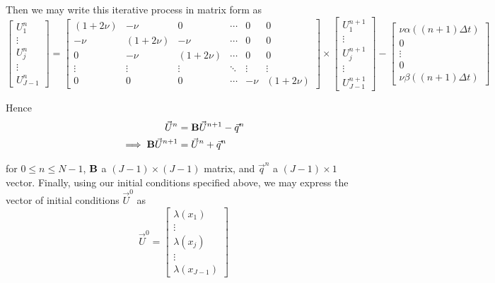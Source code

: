 \documentclass[12pt]{article}
\begin{document}
Then we may write this iterative process in matrix form as
\begin{equation*}
	\begin{bmatrix}
		U^n_1 \\
		\vdots \\
		U^n_j \\
		\vdots \\
		U^n_{J - 1}
	\end{bmatrix}
	=
	\begin{bmatrix}
		(1 + 2\nu) & -\nu & 0 & \cdots & 0 & 0 \\
		-\nu & (1 + 2\nu) & -\nu & \cdots & 0 & 0 \\
		0 & -\nu & (1 + 2\nu) & \cdots & 0 & 0 \\
		\vdots & \vdots & \vdots & \ddots & \vdots & \vdots \\
		0 & 0 & 0 & \cdots & -\nu & (1 + 2\nu) 
	\end{bmatrix} \times
	\begin{bmatrix}
		U^{n + 1}_1 \\
		\vdots \\
		U^{n + 1}_j \\
		\vdots \\
		U^{n + 1}_{J - 1}
	\end{bmatrix} - 
	\begin{bmatrix}
		\nu\alpha( (n + 1)\Delta t ) \\
		0 \\ %
		\vdots \\
		0 \\ %
		\nu\beta( (n + 1)\Delta t )
	\end{bmatrix}
\end{equation*}


Hence
\begin{align*}
	\vec{U}^n &= {\bf B} \vec{U}^{n + 1} - \vec{q}^n \\
\implies {\bf B}\vec{U}^{n + 1} &= \vec{U}^n + \vec{q}^n
\end{align*}

for $0 \leq n \leq N - 1$, ${\bf B}$ a $(J - 1)\times(J - 1)$ matrix, and $\vec{q}^n$ a $(J - 1)\times 1$ vector. Finally, using our initial conditions specified above, we may express the vector of initial conditions $\vec{U}^0$ as
\begin{equation*}
	\vec{U}^0 = 
	\begin{bmatrix}
		\lambda(x_1) \\
		\vdots \\
		\lambda(x_j) \\
		\vdots \\
		\lambda(x_{J - 1})
	\end{bmatrix}
\end{equation*}
\end{document}
